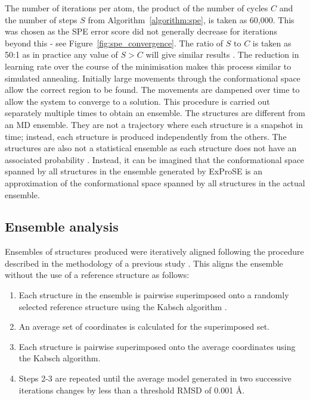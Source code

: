 The number of iterations per atom, the product of the number of cycles $C$ and the number of steps $S$ from Algorithm~\ref{algorithm:spe}, is taken as 60,000.
This was chosen as the SPE error score did not generally decrease for iterations beyond this - see Figure~\ref{fig:spe_convergence}.
The ratio of $S$ to $C$ is taken as 50:1 as in practice any value of $S > C$ will give similar results \cite{Agrafiotis2013}.
The reduction in learning rate over the course of the minimisation makes this process similar to simulated annealing.
Initially large movements through the conformational space allow the correct region to be found.
The movements are dampened over time to allow the system to converge to a solution.
This procedure is carried out separately multiple times to obtain an ensemble.
The structures are different from an MD ensemble.
They are not a trajectory where each structure is a snapshot in time; instead, each structure is produced independently from the others.
The structures are also not a statistical ensemble as each structure does not have an associated probability \cite{Bonomi2017}.
Instead, it can be imagined that the conformational space spanned by all structures in the ensemble generated by ExProSE is an approximation of the conformational space spanned by all structures in the actual ensemble.


\subsection{Ensemble analysis}

Ensembles of structures produced were iteratively aligned following the procedure described in the methodology of a previous study \cite{Bakan2009}.
This aligns the ensemble without the use of a reference structure as follows:

\begin{enumerate}
\item Each structure in the ensemble is pairwise superimposed onto a randomly selected reference structure using the Kabsch algorithm \cite{Kabsch1976}.
\item An average set of coordinates is calculated for the superimposed set.
\item Each structure is pairwise superimposed onto the average coordinates using the Kabsch algorithm.
\item Steps 2-3 are repeated until the average model generated in two successive iterations changes by less than a threshold RMSD of 0.001 \AA.
\end{enumerate}

